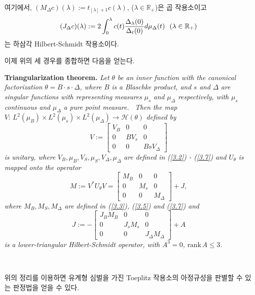 \documentclass[12pt,a4paper,2sided]{article}
\begin{document}
\newpage{}

\vspace{.8 cm}

\noindent 여기에서, $(M_{\Delta}c)(\lambda):= t_{[\lambda]+1}
c(\lambda)$, ($\lambda\in \mathbb R_+$)은 곱 작용소이고
$$
(J_{\Delta}\label{Jdelta} c)(\lambda) := 2 \int _{0}^{\lambda}c(t)
\frac{\Delta_{\lambda}(0)}{\Delta_{t}(0)} d\mu_{\Delta}(t) \ \
\hbox{($\lambda \in \mathbb R_+$)}
$$
는 하삼각 Hilbert-Schmidt 작용소이다. \

\medskip

이제 위의 세 경우를 종합하면 다음을 얻는다.

\medskip

{\bf Triangularization theorem.} \cite [p.123] {Ni} {\sl Let
$\theta$ be an inner function with the canonical factorization
$\theta=B\cdot s \cdot \Delta$, where $B$ is a Blaschke product,
and $s$ and $\Delta$ are singular functions with representing
measures $\mu_{s}$ and $\mu_{\Delta}$ respectively, with $\mu_{s}$
continuous and $\mu_{\Delta}$ a pure point measure. \  Then the
map $V:\,L^2(\mu_B)\times L^2(\mu_s) \times L^2(\mu_{\Delta})\to
\mathcal H(\theta)$ defined by
\begin{equation}\label{3.8}
V:=\begin{bmatrix}V_B&0&0\\0&BV_s&0\\0&0&BsV_{\Delta}\end{bmatrix}
\end{equation}
is unitary, where $V_B, \mu_B, V_S, \mu_S, V_\Delta, \mu_\Delta$ are
defined in (\ref{3.2}) - (\ref{3.7}) and $U_\theta$ is mapped onto
the operator
$$
M:= V^*U_\theta V =
\begin{bmatrix}M_B&0&0\\0&M_{s}&0\\0&0&M_{\Delta}\end{bmatrix}+J,
$$
where $M_B, M_S, M_{\Delta}$ are defined in (\ref{3.3}), (\ref{3.5})
and (\ref{3.7}) and
$$
J:=-\begin{bmatrix}J_BM_B&0&0\\0&J_sM_s&0\\0&0&J_{\Delta}M_\Delta\end{bmatrix}+A
$$
is a lower-triangular Hilbert-Schmidt operator, with $A^3=0$,
$\text{rank}\,A\leq 3$.}

\

위의 정리를 이용하면 유계형 심벌을 가진 Toeplitz 작용소의 아정규성을
판별할 수 있는 판정법을 얻을 수 있다.
\end{document}
